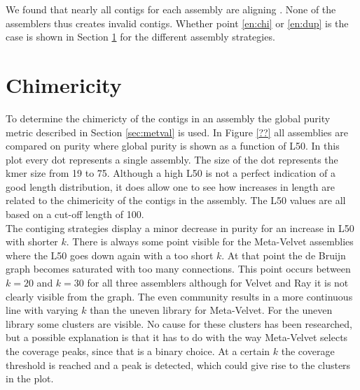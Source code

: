 \documentclass[a4paper,12pt]{report}
\begin{document}
We found that nearly all contigs for each assembly are aligning \cite{table??}.
None of the assemblers thus creates invalid contigs. Whether point \ref{en:chi}
or \ref{en:dup} is the case is shown in Section \ref{sec:reschi} for the
different assembly strategies.




\section{Chimericity}
\label{sec:reschi}
To determine the chimericty of the contigs in an assembly the global purity
metric described in Section \ref{sec:metval} is used. In Figure \ref{??} 
all assemblies are compared on purity where global purity is shown as a
function of L50. In this plot every dot represents a single assembly. The size
of the dot represents the kmer size from 19 to 75. Although a high L50 is not a
perfect indication of a good length distribution, it does allow one to see how
increases in length are related to the chimericity of the contigs in the
assembly. The L50 values are all based on a cut-off length of 100.\\


The contiging strategies display a minor decrease in purity for an increase in
L50 with shorter $k$. There is always some point visible for the Meta-Velvet
assemblies where the L50 goes down again with a too short $k$. At that point
the de Bruijn graph becomes saturated with too many connections. This point
occurs between $k=20$ and $k=30$ for all three assemblers although for Velvet
and Ray it is not clearly visible from the graph. The even community results in
a more continuous line with varying $k$ than the uneven library for
Meta-Velvet. For the uneven library some clusters are visible. No cause for
these clusters has been researched, but a possible explanation is that it has
to do with the way Meta-Velvet selects the coverage peaks, since that is a
binary choice. At a certain $k$ the coverage threshold is reached and a peak is
detected, which could give rise to the clusters in the plot.\\
\end{document}
